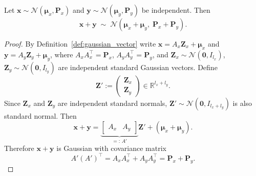

\begin{proposition} \label{prop:sum}
Let $\mathbf{x} \sim \mathcal{N}(\boldsymbol{\mu}_x, \mathbf{P}_x)$ and $\mathbf{y} \sim \mathcal{N}(\boldsymbol{\mu}_y, \mathbf{P}_y)$ be independent.
Then
\[
  \mathbf{x} + \mathbf{y} \; \sim \; \mathcal{N}(\boldsymbol{\mu}_x + \boldsymbol{\mu}_y,\; \mathbf{P}_x + \mathbf{P}_y).
\]
\end{proposition}

\begin{proof}
By Definition~\ref{def:gaussian_vector} write $\mathbf{x} = A_x\mathbf{Z}_x + \boldsymbol{\mu}_x$ and $\mathbf{y} = A_y\mathbf{Z}_y + \boldsymbol{\mu}_y$, where $A_xA_x^\top = \mathbf{P}_x$, $A_yA_y^\top = \mathbf{P}_y$, and $\mathbf{Z}_x \sim \mathcal{N}(\mathbf{0}, I_{l_x})$, $\mathbf{Z}_y \sim \mathcal{N}(\mathbf{0}, I_{l_y})$ are independent standard Gaussian vectors.
Define
\[
  \mathbf{Z}' := \begin{pmatrix}\mathbf{Z}_x\\\mathbf{Z}_y\end{pmatrix}\in \mathbb{R}^{l_x+l_y}.
\]
Since $\mathbf{Z}_x$ and $\mathbf{Z}_y$ are independent standard normals, $\mathbf{Z}' \sim \mathcal{N}(\mathbf{0}, I_{l_x+l_y})$ is also standard normal. Then
\[
  \mathbf{x} + \mathbf{y}
  = \underbrace{\begin{bmatrix}A_x & A_y\end{bmatrix}}_{=:\,A'} \mathbf{Z}' + (\boldsymbol{\mu}_x + \boldsymbol{\mu}_y).
\]
Therefore $\mathbf{x}+\mathbf{y}$ is Gaussian with covariance matrix 
\[
A'(A')^\top = A_xA_x^\top + A_yA_y^\top = \mathbf{P}_x + \mathbf{P}_y.
\]
\end{proof}



